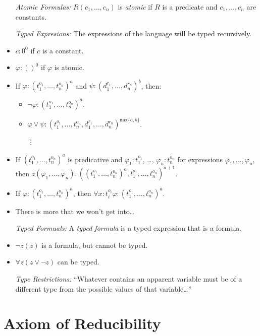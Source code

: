 \documentclass[a4paper, 11pt]{article} %
\newcommand{\set}[1]{\lbrace#1\rbrace} %
\renewcommand{\max}[1]{\texttt{max}\set{#1}}
\begin{document}
  \begin{itemize}
    \item[\it Atomic Formulas:] $R(c_1,\ldots,c_n)$ is \textit{atomic} if $R$ is a predicate and $c_1,\ldots,c_n$ are constants. 
    \item[\it Typed Expresions:] The expressions of the language will be typed recursively.
      \item $c:0^0$ if $c$ is a constant. 
      \item $\varphi:()^0$ if $\varphi$ is atomic. 
      \item If $\varphi : (t_1^{o_1},\ldots,t_n^{o_n})^a$ and $\psi : (d_1^{r_1},\ldots,d_n^{r_n})^b$, then:
        \begin{itemize}
          \item $\neg\varphi : (t_1^{o_1},\ldots,t_n^{o_n})^a$.
          \item $\varphi \vee \psi : (t_1^{o_1},\ldots,t_n^{o_n},d_1^{r_1},\ldots,d_n^{r_n})^{\max{a,b}}$.
          \item[\vdots] ~
        \end{itemize}
      \item If $(t_1^{o_1},\ldots,t_n^{o_n})^a$ is predicative and $\varphi_1 : t_1^{o_1}$, \ldots, $\varphi_n : t_n^{o_n}$ for expressions $\varphi_1,\ldots,\varphi_n$, then $z(\varphi_1,\ldots,\varphi_n) : ((t_1^{o_1},\ldots,t_n^{o_n})^a,t_1^{o_1},\ldots,t_n^{o_n})^{a+1}$.
      \item If $\varphi : (t_1^{o_1},\ldots,t_n^{o_n})^a$, then $\forall x : t_i^{o_i} \varphi : (t_1^{o_1},\ldots,t_n^{o_n})^a$.
      \item There is more that we won't get into\ldots
    \item[\it Typed Formuals:] A \textit{typed formula} is a typed expression that is a formula.
      \item $\neg z(z)$ is a formula, but cannot be typed.
      \item $\forall z(z \vee \neg z)$ can be typed.
    \item[\it Type Restrictions:] ``Whatever contains an apparent variable must be of a different type from the possible values of that variable\ldots'' 
  \end{itemize}




\section*{Axiom of Reducibility}
\end{document}
